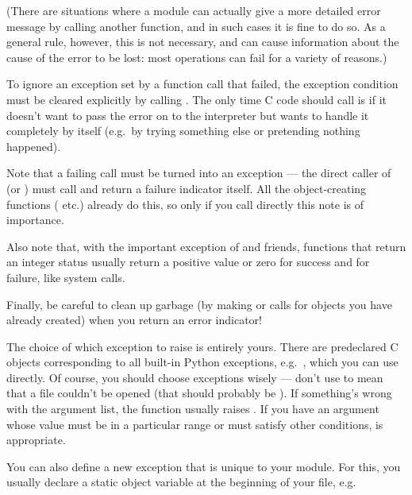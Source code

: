 \documentclass{manual}
\begin{document}
(There are situations where a module can actually give a more detailed
error message by calling another  function, and in
such cases it is fine to do so.  As a general rule, however, this is
not necessary, and can cause information about the cause of the error
to be lost: most operations can fail for a variety of reasons.)

To ignore an exception set by a function call that failed, the exception
condition must be cleared explicitly by calling . 
The only time C code should call  is if it doesn't
want to pass the error on to the interpreter but wants to handle it
completely by itself (e.g.\ by trying something else or pretending
nothing happened).

Note that a failing  call must be turned into an
exception --- the direct caller of  (or
) must call  and
return a failure indicator itself.  All the object-creating functions
( etc.) already do this, so only if you
call  directly this note is of importance.

Also note that, with the important exception of
 and friends, functions that return an
integer status usually return a positive value or zero for success and
 for failure, like \UNIX{} system calls.

Finally, be careful to clean up garbage (by making
 or  calls for objects
you have already created) when you return an error indicator!

The choice of which exception to raise is entirely yours.  There are
predeclared C objects corresponding to all built-in Python exceptions,
e.g.\ , which you can use directly.  Of
course, you should choose exceptions wisely --- don't use
 to mean that a file couldn't be opened (that
should probably be ).  If something's wrong with
the argument list, the  function usually
raises .  If you have an argument whose value
must be in a particular range or must satisfy other conditions,
 is appropriate.

You can also define a new exception that is unique to your module.
For this, you usually declare a static object variable at the
beginning of your file, e.g.
\end{document}
